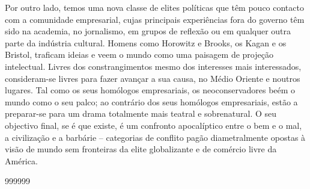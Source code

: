  
\par
 
Por outro lado, temos uma nova classe de elites políticas que têm pouco contacto com a comunidade empresarial, cujas principais experiências fora do governo têm sido na academia, no jornalismo, em grupos de reflexão ou em qualquer outra parte da indústria cultural. Homens como Horowitz e Brooks, os Kagan e os Bristol, traficam ideias e veem o mundo como uma paisagem de projeção intelectual. Livres dos constrangimentos mesmo dos interesses mais interessados, consideram-se livres para fazer avançar a sua causa, no Médio Oriente e noutros lugares. Tal como os seus homólogos empresariais, os neoconservadores beém o mundo como o seu palco; ao contrário dos seus homólogos empresariais, estão a preparar-se para um drama totalmente mais teatral e sobrenatural. O seu objectivo final, se é que existe, é um confronto apocalíptico entre o bem e o mal, a civilização e a barbárie – categorias de conflito pagão diametralmente opostas à visão de mundo sem fronteiras da elite globalizante e de comércio livre da América.
 
\par
  
 
999999
